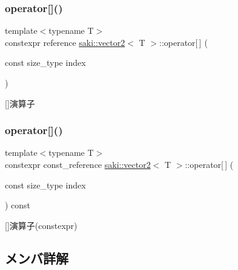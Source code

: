 \subsubsection{\texorpdfstring{operator[]()}{operator[]()}\hspace{0.1cm}{\footnotesize\ttfamily [1/2]}}
{\footnotesize\ttfamily template$<$typename T$>$ \\
constexpr reference \mbox{\hyperlink{classsaki_1_1vector2}{saki\+::vector2}}$<$ T $>$\+::operator\mbox{[}$\,$\mbox{]} (\begin{DoxyParamCaption}\item[{const size\+\_\+type}]{index }\end{DoxyParamCaption})\hspace{0.3cm}{\ttfamily [inline]}}



\mbox{[}\mbox{]}演算子 

\mbox{\label{classsaki_1_1vector2_a31bc36eae8002f6616026a33bcd4d6f7}} 
\subsubsection{\texorpdfstring{operator[]()}{operator[]()}\hspace{0.1cm}{\footnotesize\ttfamily [2/2]}}
{\footnotesize\ttfamily template$<$typename T$>$ \\
constexpr const\+\_\+reference \mbox{\hyperlink{classsaki_1_1vector2}{saki\+::vector2}}$<$ T $>$\+::operator\mbox{[}$\,$\mbox{]} (\begin{DoxyParamCaption}\item[{const size\+\_\+type}]{index }\end{DoxyParamCaption}) const\hspace{0.3cm}{\ttfamily [inline]}}



\mbox{[}\mbox{]}演算子(constexpr) 



\subsection{メンバ詳解}
\mbox{\label{classsaki_1_1vector2_a8637207f0d001c6b44deb1834c29f5ad}} 
